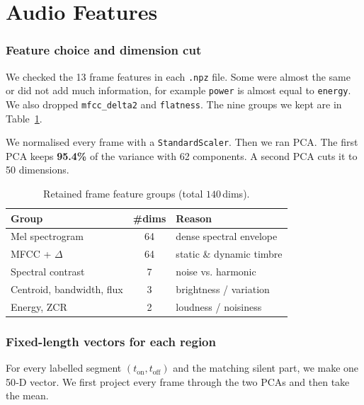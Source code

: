 \documentclass{article}
\begin{document}


\section{Audio Features}

\subsubsection{Feature choice and dimension cut}
We checked the 13 frame features in each \texttt{.npz} file. Some were almost the same or did not add much information, for example \texttt{power} is almost equal to \texttt{energy}. We also dropped \texttt{mfcc\_delta2} and \texttt{flatness}. The nine groups we kept are in Table~\ref{tab:feat}.

We normalised every frame with a \texttt{StandardScaler}. Then we ran PCA. The first PCA keeps \textbf{95.4\%} of the variance with 62 components. A second PCA cuts it to 50 dimensions.

\begin{table}[h]
    \caption{Retained frame feature groups (total $140$\,dims).}
    \label{tab:feat}
    \centering
    \begin{tabular}{lcl}
        \toprule
        Group & \#dims & Reason \\ \midrule
        Mel spectrogram            & 64 & dense spectral envelope \\
        MFCC + $\Delta$            & 64 & static \& dynamic timbre \\
        Spectral contrast          & 7  & noise vs. harmonic      \\
        Centroid, bandwidth, flux  & 3  & brightness / variation   \\
        Energy, ZCR                & 2  & loudness / noisiness     \\ \bottomrule
    \end{tabular}
\end{table}


\subsubsection{Fixed-length vectors for each region}
For every labelled segment $(t_\text{on}, t_\text{off})$ and the matching silent part, we make one 50‑D vector. We first project every frame through the two PCAs and then take the mean.
\end{document}
